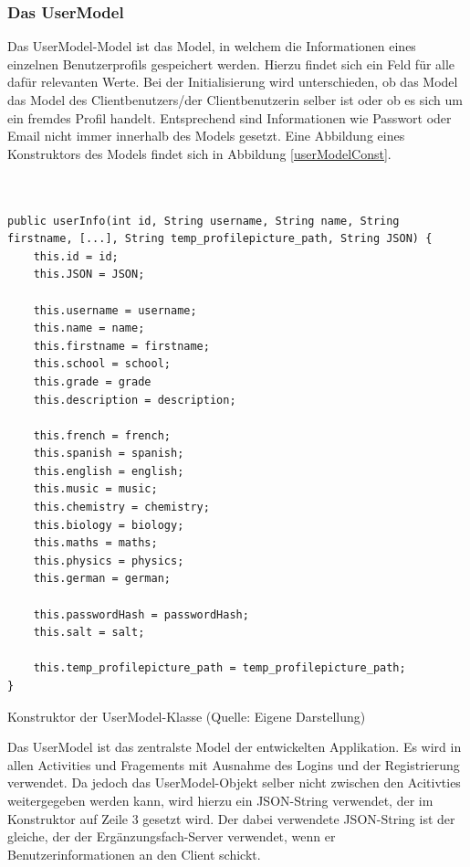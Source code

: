 \documentclass[../main.tex]{subfiles}
\begin{document}
	\subsubsection{Das UserModel}
	Das UserModel-Model ist das Model, in welchem die Informationen eines einzelnen Benutzerprofils gespeichert werden. Hierzu findet sich ein Feld für alle dafür relevanten Werte. Bei der Initialisierung wird unterschieden, ob das Model das Model des Clientbenutzers/der Clientbenutzerin selber ist oder ob es sich um ein fremdes Profil handelt. Entsprechend sind Informationen wie Passwort oder Email nicht immer innerhalb des Models gesetzt. Eine Abbildung eines Konstruktors des Models findet sich in Abbildung \ref{userModelConst}.
	
	\begin{code}
	\begin{center}
		\begin{verbatim}
		
	
public userInfo(int id, String username, String name, String firstname, [...], String temp_profilepicture_path, String JSON) {
	this.id = id;
	this.JSON = JSON;

	this.username = username;
	this.name = name;
	this.firstname = firstname;
	this.school = school;
	this.grade = grade
	this.description = description;
	
	this.french = french;
	this.spanish = spanish;
	this.english = english;
	this.music = music;
	this.chemistry = chemistry;
	this.biology = biology;
	this.maths = maths;
	this.physics = physics;
	this.german = german;
	
	this.passwordHash = passwordHash;
	this.salt = salt;

	this.temp_profilepicture_path = temp_profilepicture_path;
}
		\end{verbatim}
		\caption{Konstruktor der UserModel-Klasse (Quelle: Eigene Darstellung)}
		\label{userModelConst}
	\end{center}
	
\end{code}
	Das UserModel ist das zentralste Model der entwickelten Applikation. Es wird in allen Activities und Fragements mit Ausnahme des Logins und der Registrierung verwendet. Da jedoch das UserModel-Objekt selber nicht zwischen den Acitivties weitergegeben werden kann, wird hierzu ein JSON-String verwendet, der im Konstruktor auf Zeile 3 gesetzt wird. Der dabei verwendete JSON-String ist der gleiche, der der Ergänzungsfach-Server verwendet, wenn er Benutzerinformationen an den Client schickt.
	
\end{document}
